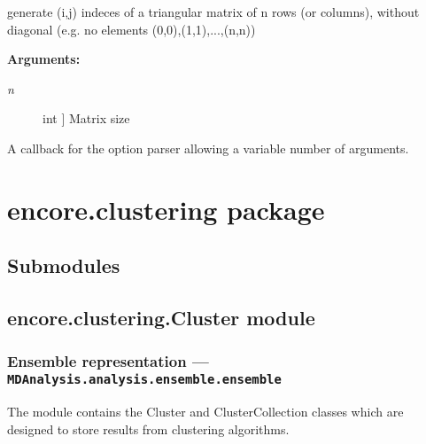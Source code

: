 \documentclass[letterpaper,10pt,english]{sphinxmanual}
\begin{document}

\begin{fulllineitems}
\label{index:encore.utils.trm_indeces_nodiag}
generate (i,j) indeces of a triangular matrix of n rows (or columns), without diagonal (e.g. no elements (0,0),(1,1),...,(n,n))

\textbf{Arguments:}
\begin{description}
\item[{\emph{n}}] \leavevmode{[}int {]}
Matrix size

\end{description}

\end{fulllineitems}


\begin{fulllineitems}
\label{index:encore.utils.vararg_callback}
A callback for the option parser allowing a variable number of arguments.

\end{fulllineitems}



\chapter{encore.clustering package}
\label{index:encore-clustering-package}

\section{Submodules}
\label{index:id7}

\section{encore.clustering.Cluster module}
\label{index:module-encore.clustering.Cluster}\label{index:encore-clustering-cluster-module}

\subsection{Ensemble representation --- \texttt{MDAnalysis.analysis.ensemble.ensemble}}
\label{index:id8}
The module contains the Cluster and ClusterCollection classes which are designed
to store results from clustering algorithms.
\end{document}
